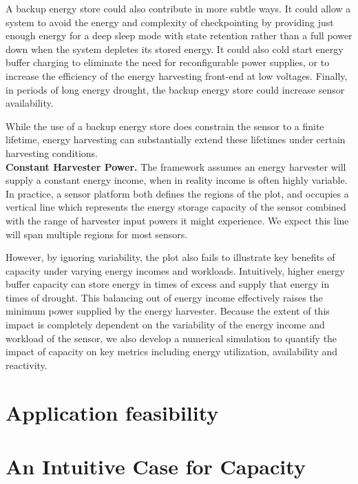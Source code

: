 A backup energy store could also contribute in more subtle ways. It could
allow a system to avoid the energy and complexity of checkpointing by
providing just enough energy for a deep sleep mode with state retention rather
than a full power down when the system depletes its stored energy. It could also
cold start energy buffer charging to eliminate the need for reconfigurable
power supplies, or to increase the efficiency of
the energy harvesting front-end at low voltages.
Finally, in periods of long energy drought, the backup energy store could increase
sensor availability.

While the use of a backup energy store
does constrain the sensor to a finite lifetime,
energy harvesting can substantially extend these lifetimes under certain harvesting
conditions.\\

\vspace{-6pt}
\noindent
\textbf{Constant Harvester Power.}
The framework assumes an energy harvester will supply a constant energy
income, when in reality income is often highly variable. In practice, a sensor
platform both defines the regions of the plot, and occupies a
vertical line which represents the energy storage capacity of the sensor
combined with the range of harvester input powers it might experience. We expect
this line will span multiple regions for most sensors.

However, by ignoring variability, the plot also fails to illustrate key benefits
of capacity under varying energy incomes and workloads. Intuitively,
higher energy buffer capacity can store energy in times of excess and supply
that energy in times of drought. This balancing out of energy income
effectively raises the minimum power supplied by the energy harvester.
Because the extent of this impact is completely dependent on the variability
of the energy income and workload of the sensor, we also develop a numerical simulation to
quantify the impact of capacity
on key metrics including energy utilization, availability and reactivity.

\section{Application feasibility}

\section{An Intuitive Case for Capacity}

